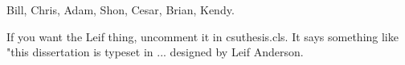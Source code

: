 \begin{acknowledgements}
Bill, Chris, Adam, Shon, Cesar, Brian, Kendy.

If you want the Leif thing, uncomment it in csuthesis.cls.  It says something like "this dissertation is typeset in ... designed by Leif Anderson.
\end{acknowledgements}